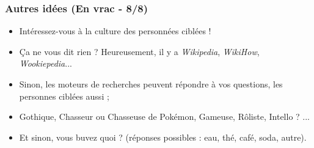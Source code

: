 \documentclass[slidetop,11pt]{beamer}
\begin{document}
\begin{frame}
	\frametitle{Autres id{\'e}es (En vrac - 8/8)}
	\begin{itemize}
		\item Int{\'e}ressez-vous {\`a} la culture des personn{\'e}es cibl{\'e}es ! 
		\item \c{C}a ne vous dit rien ? Heureusement, il y a \emph{Wikipedia}, \emph{WikiHow}, \emph{Wookiepedia}...
		\item Sinon, les moteurs de recherches peuvent r{\'e}pondre {\`a} vos questions, les personnes cibl{\'e}es aussi ; 
		\item Gothique, Chasseur ou Chasseuse de Pok{\'e}mon, Gameuse, R{\^o}liste, Intello ? ... 
		\item Et sinon, vous buvez quoi ? (r{\'e}ponses possibles : eau, th{\'e}, caf{\'e}, soda, autre). 
	\end{itemize}
\end{frame}

\end{document}
